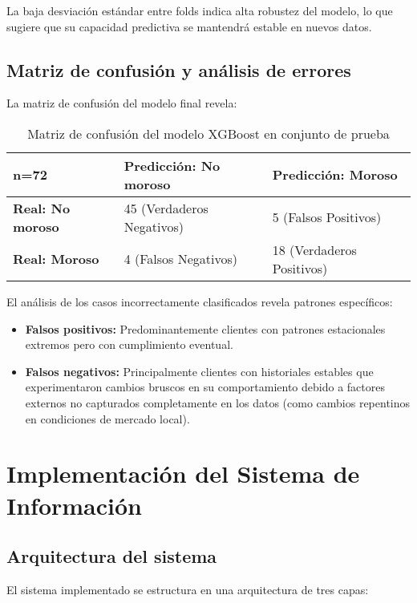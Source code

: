 La baja desviación estándar entre folds indica alta robustez del modelo, lo que sugiere que su capacidad predictiva se mantendrá estable en nuevos datos.

\subsection{Matriz de confusión y análisis de errores}
La matriz de confusión del modelo final revela:

\begin{table}[ht]
\centering
\begin{tabular}{|p{3cm}|p{3cm}|p{3cm}|}
\hline
\textbf{n=72} & \textbf{Predicción: No moroso} & \textbf{Predicción: Moroso} \\
\hline
\textbf{Real: No moroso} & 45 (Verdaderos Negativos) & 5 (Falsos Positivos) \\
\hline
\textbf{Real: Moroso} & 4 (Falsos Negativos) & 18 (Verdaderos Positivos) \\
\hline
\end{tabular}
\caption{Matriz de confusión del modelo XGBoost en conjunto de prueba}
\end{table}

El análisis de los casos incorrectamente clasificados revela patrones específicos:

\begin{itemize}
    \item \textbf{Falsos positivos:} Predominantemente clientes con patrones estacionales extremos pero con cumplimiento eventual.
    
    \item \textbf{Falsos negativos:} Principalmente clientes con historiales estables que experimentaron cambios bruscos en su comportamiento debido a factores externos no capturados completamente en los datos (como cambios repentinos en condiciones de mercado local).
\end{itemize}

\section{Implementación del Sistema de Información}
\subsection{Arquitectura del sistema}
El sistema implementado se estructura en una arquitectura de tres capas:

